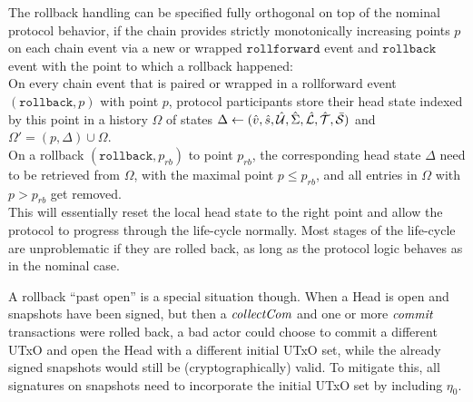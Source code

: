 The rollback handling can be specified fully orthogonal on top of the nominal
protocol behavior, if the chain provides strictly monotonically increasing
points $p$ on each chain event via a new or wrapped $\mathtt{rollforward}$
event and $\mathtt{rollback}$ event with the point to which a rollback happened:\\

\quad On every chain event that is paired or
wrapped in a rollforward event $(\mathtt{rollback},p)$ with point $p$, protocol
participants store their head state indexed by this point in a history
$\Omega$ of states $\Delta \gets (\hat v, \hat s, \hat {\mathcal U}, \hat{\Sigma}, \hat {\mathcal L}, \hat {\mathcal T}, \bar{\mathcal S})$ and $\Omega' = (p, \Delta) \cup \Omega$. \\

\quad On a rollback
$(\mathtt{rollback},p_{rb})$ to point $p_{rb}$, the corresponding head state
$\Delta$ need to be retrieved from $\Omega$, with the maximal point
$p \leq p_{rb}$, and all entries in $\Omega$ with $p > p_{rb}$ get removed. \\

This will essentially reset the local head state to the right point and allow
the protocol to progress through the life-cycle normally. Most stages of the
life-cycle are unproblematic if they are rolled back, as long as the protocol
logic behaves as in the nominal case.

A rollback ``past open'' is a special situation though. When a Head is open and
snapshots have been signed, but then a $\textit{collectCom}$ and one or more
$\textit{commit}$ transactions were rolled back, a bad actor could choose to commit a
different UTxO and open the Head with a different initial UTxO set, while the
already signed snapshots would still be (cryptographically) valid. To mitigate
this, all signatures on snapshots need to incorporate the initial UTxO set by
including $\eta_{0}$. 




